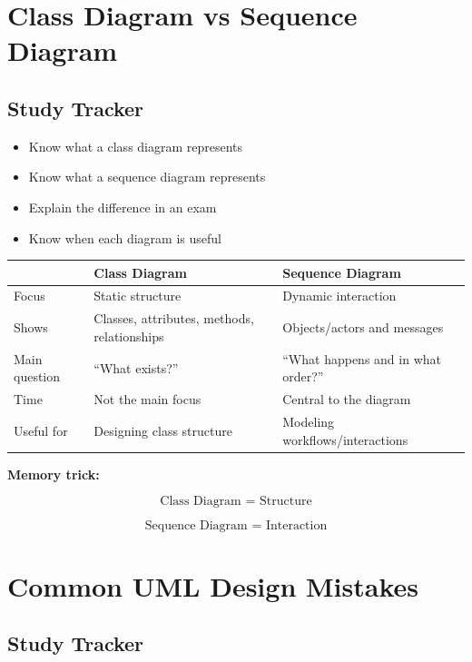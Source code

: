 \documentclass[11pt,a4paper]{article}
\newcommand{\checkitem}{$\square$}
\begin{document}
\section{Class Diagram vs Sequence Diagram}

\subsection{Study Tracker}

\begin{itemize}[label=\checkitem]
    \item Know what a class diagram represents
    \item Know what a sequence diagram represents
    \item Explain the difference in an exam
    \item Know when each diagram is useful
\end{itemize}

\begin{tabularx}{\textwidth}{|p{}|X|X|}
\hline
 & \textbf{Class Diagram} & \textbf{Sequence Diagram}\\
\hline
Focus & Static structure & Dynamic interaction\\
\hline
Shows & Classes, attributes, methods, relationships & Objects/actors and messages\\
\hline
Main question & ``What exists?'' & ``What happens and in what order?''\\
\hline
Time & Not the main focus & Central to the diagram\\
\hline
Useful for & Designing class structure & Modeling workflows/interactions\\
\hline
\end{tabularx}

\begin{conceptbox}
\textbf{Memory trick:}

\[
\boxed{\text{Class Diagram = Structure}}
\]

\[
\boxed{\text{Sequence Diagram = Interaction}}
\]
\end{conceptbox}

\section{Common UML Design Mistakes}

\subsection{Study Tracker}
\end{document}
